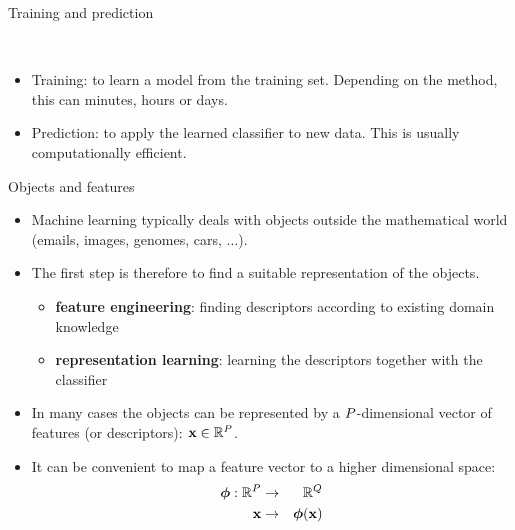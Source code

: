 \documentclass[xcolor=pdftex,dvipsnames,table]{beamer}
\begin{document}
\begin{frame}{Training and prediction}
\begin{figure}[htb]
  \centering
  \\  
\end{figure}
\begin{itemize}
\item Training: to learn a model from the training set. Depending on the method, this can minutes, hours or days.
\item Prediction: to apply the learned classifier to new data. This is usually computationally efficient. 
\end{itemize}
\end{frame}

\begin{frame}{Objects and features}
\begin{itemize}
\item Machine learning typically deals with objects outside the mathematical world (emails, images, genomes, cars, $\ldots$).
\item The first step is therefore to find a suitable representation of the objects. 
\begin{itemize}
\item \textbf{feature engineering}: finding descriptors according to existing domain knowledge
\item \textbf{representation learning}: learning the descriptors together with the classifier
\end{itemize}
\item In many cases the objects can be represented by a $P$-dimensional vector of features (or descriptors): $\mathbf{x} \in \mathbb{R}^{P}$. 
\item It can be convenient to map a feature vector to a higher dimensional space:
\begin{eqnarray}
\boldsymbol{\phi} : \mathbb{R}^{P} &\rightarrow & \mathbb{R}^Q \\
\mathbf{x} &\rightarrow &\boldsymbol{\phi} (\mathbf{x})
\end{eqnarray}
\end{itemize}
\end{frame}
\end{document}
